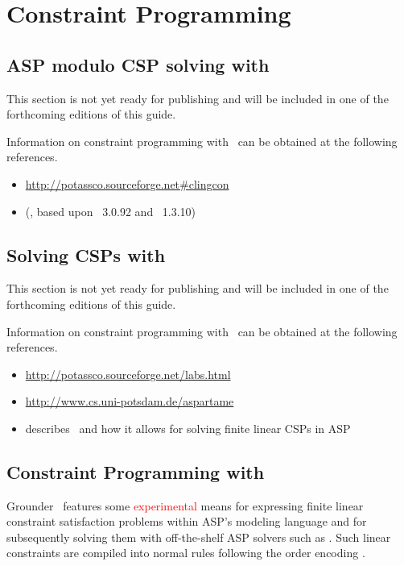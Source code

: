 \section{Constraint Programming}\label{sec:constraint}

\subsection{ASP modulo CSP solving with \clingcon}
\label{sec:clingcon}

This section is not yet ready for publishing
and will be included in one of the forthcoming editions of this guide.

Information on constraint programming with \clingcon\ can be obtained at the following references.

\begin{itemize}
\item \url{http://potassco.sourceforge.net#clingcon}
\item \cite{geossc09a,ostsch12a} (\clingcon, based upon \gringo~3.0.92 and \clasp~1.3.10)
\end{itemize}

\subsection{Solving CSPs with \aspartame}
\label{sec:aspartame}

This section is not yet ready for publishing
and will be included in one of the forthcoming editions of this guide.

Information on constraint programming with \aspartame\ can be obtained at the following references.

\begin{itemize}
\item \url{http://potassco.sourceforge.net/labs.html}
\item \url{http://www.cs.uni-potsdam.de/aspartame}
\item \cite{bageinscsotawe13a} describes \aspartame\ and how it allows for solving finite linear CSPs in ASP
\end{itemize}

\subsection{Constraint Programming with \gringo}

Grounder \gringo\ features some \textcolor{red}{experimental} means for expressing finite linear constraint satisfaction problems within ASP's modeling language and
for subsequently solving them with off-the-shelf ASP solvers such as \clasp.
Such linear constraints are compiled into normal rules following the order encoding \cite{tatakiba09a,bageinscsotawe13a}.

